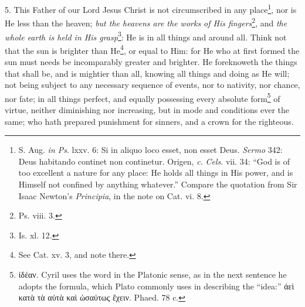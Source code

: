 5. This Father of our Lord Jesus Christ is not circumscribed in any place\footnote{S. Aug. \emph{in Ps}. lxxv. 6: Si in aliquo loco esset, non esset Deus. \emph{Sermo} 342: Deus habitando continet non continetur. Origen, \emph{c.} \emph{Cels}. vii. 34: “God is of too excellent a nature for any place: He holds all things in His power, and is Himself not confined by anything whatever.” Compare the quotation from Sir Isaac Newton’s \emph{Principia}, in the note on Cat. vi. 8.}, nor is He less than the heaven; \emph{but the heavens are the works of His fingers}\footnote{Ps. viii. 3.}, and \emph{the whole earth is held in His grasp}\footnote{Is. xl. 12.}: He is in all things and around all. Think not that the sun is brighter than He\footnote{See Cat. xv. 3, and note there.}, or equal to Him: for He who at first formed the sun must needs be incomparably greater and brighter. He foreknoweth the things that shall be, and is mightier than all, knowing all things and doing as He will; not being subject to any necessary sequence of events, nor to nativity, nor chance, nor fate; in all things perfect, and equally possessing every absolute form\footnote{\textgreek{ἰδέαν}. Cyril uses the word in the Platonic sense, as in the next sentence he adopts the formula, which Plato commonly uses in describing the “idea:” \textgreek{ἀεὶ κατὰ τὰ αὐτὰ καὶ ὡσαύτως ἔχειν}. Phaed. 78 c.} of virtue, neither diminishing nor increasing, but in mode and conditions ever the same; who hath prepared punishment for sinners, and a crown for the righteous.

